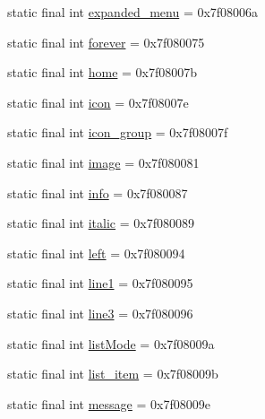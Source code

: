 \begin{DoxyCompactItemize}
\item 
static final int \mbox{\hyperlink{classandroid_1_1support_1_1v7_1_1appcompat_1_1_r_1_1id_a3aa9e89f2cfd5dd834212e9e9d185a81}{expanded\+\_\+menu}} = 0x7f08006a
\item 
static final int \mbox{\hyperlink{classandroid_1_1support_1_1v7_1_1appcompat_1_1_r_1_1id_ac482eacd695f4a22c19507fd2a40f696}{forever}} = 0x7f080075
\item 
static final int \mbox{\hyperlink{classandroid_1_1support_1_1v7_1_1appcompat_1_1_r_1_1id_acedb19aa69792f84b956f8fb7cc4b972}{home}} = 0x7f08007b
\item 
static final int \mbox{\hyperlink{classandroid_1_1support_1_1v7_1_1appcompat_1_1_r_1_1id_a4aedeaf21775058da43c7431df03fd74}{icon}} = 0x7f08007e
\item 
static final int \mbox{\hyperlink{classandroid_1_1support_1_1v7_1_1appcompat_1_1_r_1_1id_ae198dc56dc986e6073f5d91f1e57de9b}{icon\+\_\+group}} = 0x7f08007f
\item 
static final int \mbox{\hyperlink{classandroid_1_1support_1_1v7_1_1appcompat_1_1_r_1_1id_ab241f4f2c0eadbf28120bd907d5756c7}{image}} = 0x7f080081
\item 
static final int \mbox{\hyperlink{classandroid_1_1support_1_1v7_1_1appcompat_1_1_r_1_1id_a38db22f7031085d2c98980b68baa9d2c}{info}} = 0x7f080087
\item 
static final int \mbox{\hyperlink{classandroid_1_1support_1_1v7_1_1appcompat_1_1_r_1_1id_aa78c67a96c1621bd6c977ed72aad9094}{italic}} = 0x7f080089
\item 
static final int \mbox{\hyperlink{classandroid_1_1support_1_1v7_1_1appcompat_1_1_r_1_1id_ad576f6e1dd1ecb9ceb61dca934fa9e2f}{left}} = 0x7f080094
\item 
static final int \mbox{\hyperlink{classandroid_1_1support_1_1v7_1_1appcompat_1_1_r_1_1id_a89744f9f50d9da0cb8219f081a2bc47e}{line1}} = 0x7f080095
\item 
static final int \mbox{\hyperlink{classandroid_1_1support_1_1v7_1_1appcompat_1_1_r_1_1id_ac494a9871238dcf6ff5a1debc911c999}{line3}} = 0x7f080096
\item 
static final int \mbox{\hyperlink{classandroid_1_1support_1_1v7_1_1appcompat_1_1_r_1_1id_a523b582894e761fb50c74f46aaa26448}{list\+Mode}} = 0x7f08009a
\item 
static final int \mbox{\hyperlink{classandroid_1_1support_1_1v7_1_1appcompat_1_1_r_1_1id_acbc2d1a0b0995143f0b7c4c223f75d3f}{list\+\_\+item}} = 0x7f08009b
\item 
static final int \mbox{\hyperlink{classandroid_1_1support_1_1v7_1_1appcompat_1_1_r_1_1id_ae113da02d5d7919e91a660272de7ccfd}{message}} = 0x7f08009e

\end{DoxyCompactItemize}

